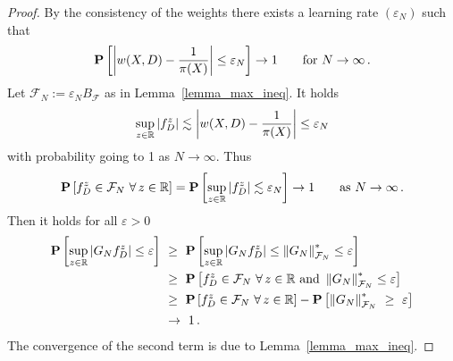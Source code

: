 \begin{proof}
  By the consistency of the weights there exists a learning rate $(\varepsilon_N)$ such that
  \begin{gather}
    \P
    \left[ 
      \left| 
      w(X,D)
      -
      \frac{1}{\pi(X)}
      \right|
      \le
      \varepsilon_N
    \right]
    \to 1 
    \qquad
    \text{for}\ 
    N\to \infty
    \,.
  \end{gather}
  Let
  $\mathcal{F}_N:=\varepsilon_NB_\mathcal{F}$ as in 
  Lemma~\ref{lemma_max_ineq}.
  It holds
\begin{gather}
      \sup_{z\in\mathbb{R}}
      \left| 
    f_D^z
      \right|
      \lesssim
      \left| 
      w(X,D)
      -
      \frac{1}{\pi(X)}
      \right|
      \le
      \varepsilon_N
\end{gather}
with probability going to 1 as $N\to\infty$.
Thus
 \begin{gather}
    \P
    \left[ 
    f_D^z
    \in
  \mathcal{F}_N
  \ \forall\,z\in\R
    \right]
    =
    \P
    \left[ 
      \sup_{z\in\R}
      \left| 
    f_D^z
      \right|
      \lesssim
      \varepsilon_N
    \right]
    \to 1
    \qquad
    \text{as}
    \ 
    N\to\infty
    \,.
  \end{gather}
  Then it holds
  for all $\varepsilon>0$ 
  \begin{align*}
    \P
    \left[ 
      \sup_{z\in\R}
  \left| G_Nf_D^z \right|
  \le
  \varepsilon
    \right]
    &
    \ 
    \ge
    \ 
    \P
    \left[ 
      \sup_{z\in\R}
  \left| G_Nf_D^z \right|
  \le
  \norm{G_N}^*_{\mathcal{F}_N}
  \le
  \varepsilon
    \right]
    \\
    &
    \ 
    \ge
    \ 
    \P
    \left[ 
    f_D^z
    \in
  \mathcal{F}_N
  \ \forall\,z\in\R
      \ 
      \text{and}\ 
  \norm{G_N}^*_{\mathcal{F}_N}
  \le
  \varepsilon
    \right]
    \\
    &
    \ 
    \ge
    \ 
    \P
    \left[ 
    f_D^z
    \in
  \mathcal{F}_N
  \ \forall\,z\in\R
    \right]
    -
    \P
    \left[ 
  \norm{G_N}^*_{\mathcal{F}_N}
    \ 
  \ge
    \ 
  \varepsilon
    \right]
    \\
    &
    \ 
    \to
    \ 
    1
    \,.
  \end{align*}
  The convergence of the second term is due to Lemma~\ref{lemma_max_ineq}.

\end{proof}

